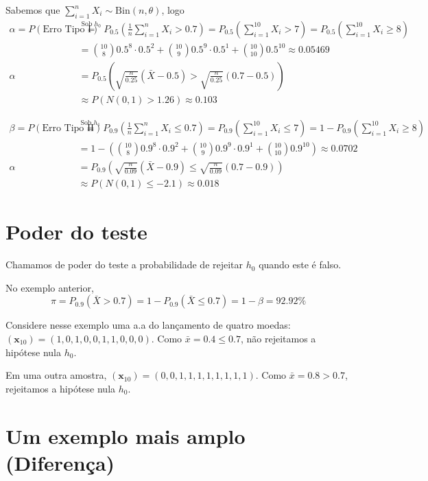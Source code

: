 \documentclass[
  letterpaper,
  DIV=11,
  numbers=noendperiod]{scrreprt}
\begin{document}
Sabemos que \(\sum ^{n}_{i=1}X_{i}\sim \mathrm{Bin}(n, \theta)\), logo
\[
\begin{aligned}
\alpha = P(\text{Erro Tipo I}) &\stackrel{\text{Sob $h_{0}$}}{=} P_{0.5}\left( \frac{1}{n} \sum^n_{i=1}X_{i}> 0.7\right)
= P_{0.5}\left( \sum^{10}_{i=1}X_{i} > 7 \right) = P_{0.5}\left( \sum^{10}_{i=1} X_{i} \geq 8 \right) \\
&= \binom{10}{8} 0.5^{8} \cdot 0.5^{2} + \binom{10}{9} 0.5^{9} \cdot 0.5^{1} + \binom{10}{10} 0.5^{10} \approx 0.05469 \\
\alpha & = P_{0.5}\left( \sqrt{ \frac{n}{0.25}}(\bar{X}-0.5) >\sqrt{ \frac{n}{0.25}}(0.7-0.5) \right) \\
& \approx P(N(0,1) > 1.26) \approx 0.103
\end{aligned}
\]

\[
\begin{aligned}
\beta= P(\text{Erro Tipo II}) &\stackrel{\text{Sob $h_{1}$}}{=} P_{0.9}\left( \frac{1}{n} \sum^n_{i=1}X_{i}\leq 0.7\right)
= P_{0.9}\left( \sum^{10}_{i=1}X_{i} \leq 7 \right) = 1-P_{0.9}\left( \sum^{10}_{i=1} X_{i} \geq 8 \right) \\
&= 1-\left(\binom{10}{8} 0.9^{8} \cdot 0.9^{2} + \binom{10}{9} 0.9^{9} \cdot 0.9^{1} + \binom{10}{10} 0.9^{10}\right)
\approx 0.0702 \\
\alpha & = P_{0.9}\left( \sqrt{ \frac{n}{0.09}}(\bar{X}-0.9) \leq \sqrt{ \frac{n}{0.09}}(0.7-0.9) \right) \\
& \approx P(N(0,1) \leq -2.1) \approx 0.018
\end{aligned}
\]

\section{Poder do teste}\label{poder-do-teste}

Chamamos de poder do teste a probabilidade de rejeitar \(h_{0}\) quando
este é falso.

No exemplo anterior, \[
\pi = P_{0.9}(\bar{X} > 0.7) = 1-P_{0.9}(\bar{X}\leq 0.7) = 1 - \beta = 92.92\%
\]

Considere nesse exemplo uma a.a do lançamento de quatro moedas:
\((\pmb{x}_{10}) = (1, 0, 1, 0,0,1,1,0,0,0)\). Como
\(\bar{x}=0.4 \leq 0.7\), não rejeitamos a hipótese nula \(h_{0}\).

Em uma outra amostra, \((\pmb{x}_{10}) = (0,0,1,1,1,1,1,1,1,1)\). Como
\(\bar{x}=0.8 > 0.7\), rejeitamos a hipótese nula \(h_{0}\).

\section{Um exemplo mais amplo
(Diferença)}\label{um-exemplo-mais-amplo-diferenuxe7a}
\end{document}

